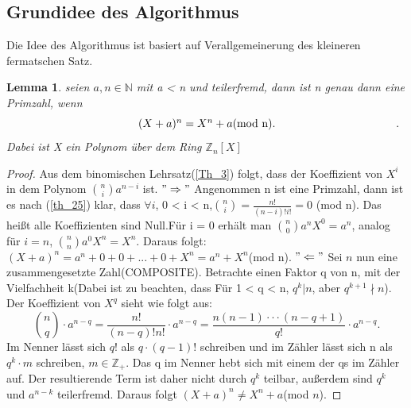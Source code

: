 \documentclass[12pt,oneside]{article}
\newtheorem{lemma}[theorem]{Lemma}
\theoremstyle{remark}
\theoremstyle{definition}
\begin{document}
\subsection{Grundidee des Algorithmus}
Die Idee des Algorithmus ist basiert auf  Verallgemeinerung des kleineren fermatschen Satz.
\begin{flushleft}
\begin{lemma}\label{hauptlemma}
seien $a,n \in \mathbb{N}$ mit a < n und teilerfremd, dann ist n genau dann eine Primzahl, wenn \newline
\begin{equation}\label{eq:1}
\centerline{ $(X + a)^n = X^n +a $(mod n).}.
\end{equation}\newline
Dabei ist X ein Polynom über dem Ring $\mathbb{Z}_{n}[X]$
\end{lemma}
\begin{proof}
Aus dem binomischen Lehrsatz(\ref{Th_3}) folgt, dass der Koeffizient von $X^i$ in dem Polynom ${n \choose i} a^{n-i}$ ist.\newline\newline
$"\Rightarrow"$\newline
Angenommen n ist eine Primzahl, dann ist es nach (\ref{th_25}) klar, dass $\forall i $, 0 < i < n,\newline\smallskip ${n \choose i} = \frac{n!}{(n-i)! i!} = 0 $ (mod n). Das heißt alle Koeffizienten sind Null.\newline\smallskip Für i = 0 erhält man  ${n \choose 0} a^n X^0 = a^n$, analog für $i = n$, ${n \choose n} a^0 X^n = X^n$. Daraus folgt:
$(X + a)^n = a^n + 0 + 0 + ... + 0 + X^n = a^n + X^n$(mod n).\newline\newline
$"\Leftarrow"$\newline
Sei $n$ nun eine zusammengesetzte Zahl(COMPOSITE). Betrachte einen Faktor q von n, mit der Vielfachheit k(Dabei ist zu beachten, dass Für 1 < q < n, $q^k | n$, aber $q^{k+1} \nmid n$).\newline
Der Koeffizient von $X^q$ sieht wie folgt aus:\newline\smallskip
\begin{equation}
    {n \choose q} \cdot a^{n-q} = \frac{n!}{(n-q)! n!} \cdot a^{n-q} = \frac{n(n-1)\cdot \cdot \cdot (n-q+1)}{q!} \cdot a^{n-q}.
\end{equation}
\newline\newline
Im Nenner lässt sich $q!$ als $q \cdot (q-1)!$ schreiben und im Zähler lässt sich n als $q^k\cdot m$ schreiben, $m \in \mathbb{Z}_{+}$. Das q im Nenner hebt sich mit einem der qs im Zähler auf. Der resultierende Term ist daher nicht durch $q^k$ teilbar, außerdem sind $q^k$ und $a^{n-k}$ teilerfremd. Daraus folgt $(X + a)^n \neq X^n + a $(mod $n$).
\end{proof}


\end{flushleft}
\end{document}
